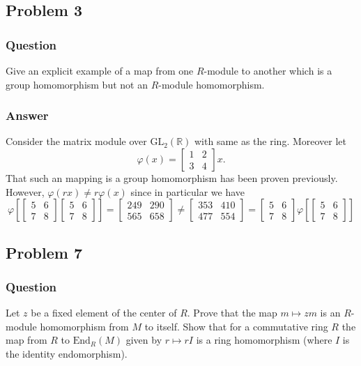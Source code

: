 \documentclass[12pt]{article}
\begin{document}
\subsection{Problem 3}

\subsubsection{Question}
Give an explicit example of a map from one $R$-module to another which is a group homomorphism but not an $R$-module homomorphism.
\subsubsection{Answer}
Consider the matrix module over $\mathrm{GL}_2(\mathbb{R})$ with same as the ring. Moreover let 
\[\varphi(x)= \left[ \begin{array}{lr} 1&2\\3&4\end{array}\right] x. \]
That such an mapping is a group homomorphism has been proven previously. However, $\varphi(r x ) \neq r \varphi (x) $ since in particular we have
\[\varphi[
\left[
\begin{array}{lr}
5&6\\7&8
\end{array}
\right]
\left[
\begin{array}{lr}
5&6\\7&8
\end{array}
\right]
]=\left[
\begin{array}{cc}
 249 & 290 \\
 565 & 658
\end{array}
\right] \neq 
\left[
\begin{array}{cc}
 353 & 410 \\
 477 & 554
\end{array}
\right]
=
\left[
\begin{array}{lr}
5&6\\7&8
\end{array}
\right]
 \varphi[
\left[
\begin{array}{lr}
5&6\\7&8
\end{array}
\right]
]
\]

\subsection{Problem 7}

\subsubsection{Question}
Let $z$ be a fixed element of the center of $R$. Prove that the map $m \mapsto z m$ is an $R$-module homomorphism from $M$ to itself. Show that for a commutative ring $R$ the map from $R$ to $\mathrm{End}_R (M)$ given by $r \mapsto r I $ is a ring homomorphism (where $I$ is the identity endomorphism).
\end{document}
